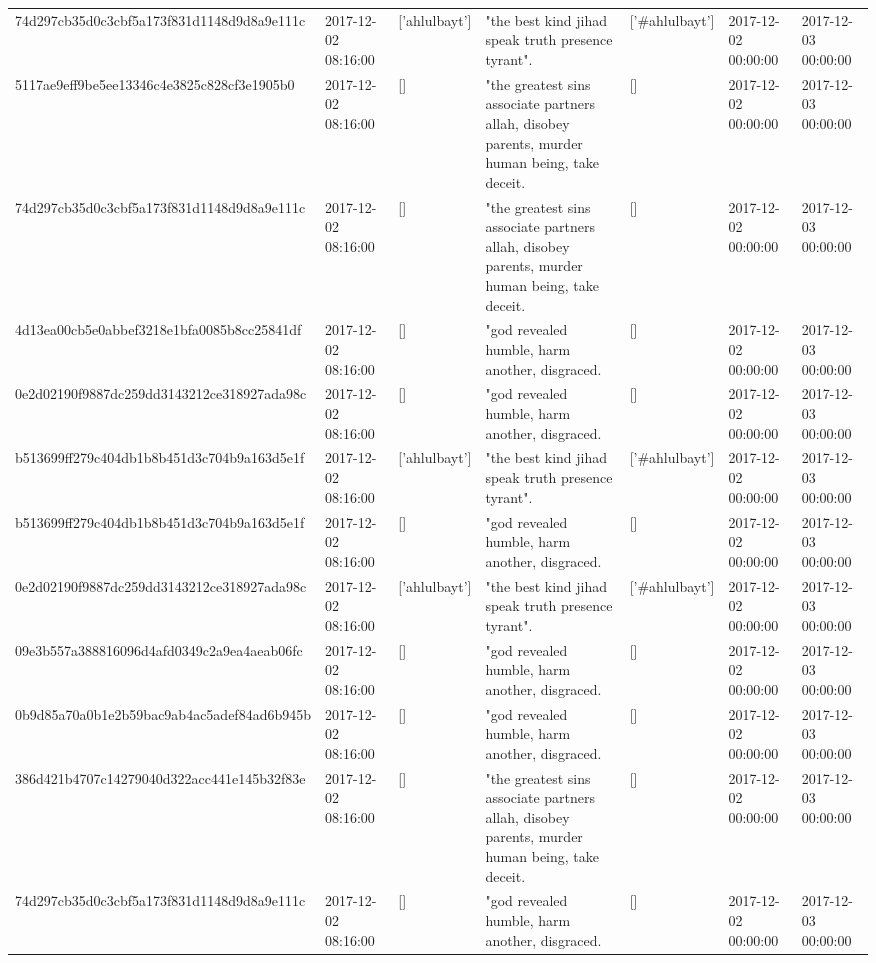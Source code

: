 \begin{tabular}{lllllll}
74d297cb35d0c3cbf5a173f831d1148d9d8a9e111c & 2017-12-02 08:16:00 & ['ahlulbayt'] & "the best kind jihad speak truth presence tyrant". & ['#ahlulbayt'] & 2017-12-02 00:00:00 & 2017-12-03 00:00:00 \\
5117ae9eff9be5ee13346c4e3825c828cf3e1905b0 & 2017-12-02 08:16:00 & [] & "the greatest sins associate partners allah, disobey parents, murder human being, take deceit. & [] & 2017-12-02 00:00:00 & 2017-12-03 00:00:00 \\
74d297cb35d0c3cbf5a173f831d1148d9d8a9e111c & 2017-12-02 08:16:00 & [] & "the greatest sins associate partners allah, disobey parents, murder human being, take deceit. & [] & 2017-12-02 00:00:00 & 2017-12-03 00:00:00 \\
4d13ea00cb5e0abbef3218e1bfa0085b8cc25841df & 2017-12-02 08:16:00 & [] & "god revealed humble, harm another, disgraced. & [] & 2017-12-02 00:00:00 & 2017-12-03 00:00:00 \\
0e2d02190f9887dc259dd3143212ce318927ada98c & 2017-12-02 08:16:00 & [] & "god revealed humble, harm another, disgraced. & [] & 2017-12-02 00:00:00 & 2017-12-03 00:00:00 \\
b513699ff279c404db1b8b451d3c704b9a163d5e1f & 2017-12-02 08:16:00 & ['ahlulbayt'] & "the best kind jihad speak truth presence tyrant". & ['#ahlulbayt'] & 2017-12-02 00:00:00 & 2017-12-03 00:00:00 \\
b513699ff279c404db1b8b451d3c704b9a163d5e1f & 2017-12-02 08:16:00 & [] & "god revealed humble, harm another, disgraced. & [] & 2017-12-02 00:00:00 & 2017-12-03 00:00:00 \\
0e2d02190f9887dc259dd3143212ce318927ada98c & 2017-12-02 08:16:00 & ['ahlulbayt'] & "the best kind jihad speak truth presence tyrant". & ['#ahlulbayt'] & 2017-12-02 00:00:00 & 2017-12-03 00:00:00 \\
09e3b557a388816096d4afd0349c2a9ea4aeab06fc & 2017-12-02 08:16:00 & [] & "god revealed humble, harm another, disgraced. & [] & 2017-12-02 00:00:00 & 2017-12-03 00:00:00 \\
0b9d85a70a0b1e2b59bac9ab4ac5adef84ad6b945b & 2017-12-02 08:16:00 & [] & "god revealed humble, harm another, disgraced. & [] & 2017-12-02 00:00:00 & 2017-12-03 00:00:00 \\
386d421b4707c14279040d322acc441e145b32f83e & 2017-12-02 08:16:00 & [] & "the greatest sins associate partners allah, disobey parents, murder human being, take deceit. & [] & 2017-12-02 00:00:00 & 2017-12-03 00:00:00 \\
74d297cb35d0c3cbf5a173f831d1148d9d8a9e111c & 2017-12-02 08:16:00 & [] & "god revealed humble, harm another, disgraced. & [] & 2017-12-02 00:00:00 & 2017-12-03 00:00:00 \\

\end{tabular}
